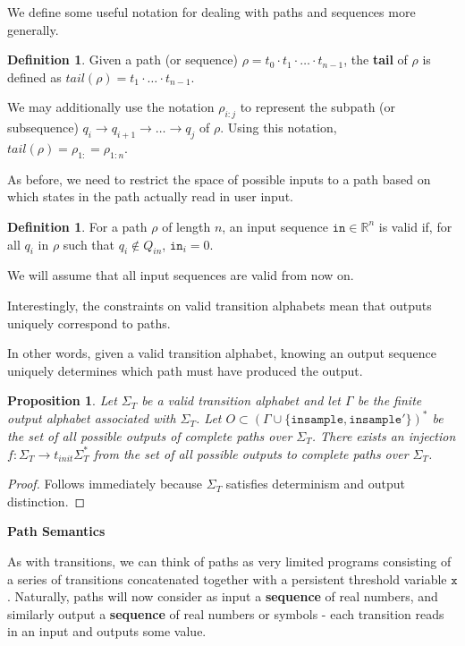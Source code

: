 \documentclass[12pt]{article}
\newcommand{\RR}{\mathbb{R}}
\newtheorem{prop}[thm]{Proposition}
\theoremstyle{definition}
\newtheorem{defn}[thm]{Definition}
\begin{document}
We define some useful notation for dealing with paths and sequences more generally. 

\begin{defn}
    Given a path (or sequence) $\rho = t_0\cdot t_1\cdot \ldots\cdot t_{n-1}$, the \textbf{tail} of $\rho$ is defined as $tail(\rho) = t_1\cdot \ldots\cdot t_{n-1}$. 

    We may additionally use the notation $\rho_{i:j}$ to represent the subpath (or subsequence) $q_i\to q_{i+1}\to \ldots \to q_j$ of $\rho$. Using this notation, $tail(\rho) = \rho_{1:} = \rho_{1:n}$.
\end{defn}


As before, we need to restrict the space of possible inputs to a path based on which states in the path actually read in user input.
\begin{defn}
    For a path $\rho$ of length $n$, an input sequence $\texttt{in}\in \RR^n$ is valid if, for all $q_i$ in $\rho$ such that $q_i \notin Q_{in}$, $\texttt{in}_i = 0$.  
\end{defn} 

We will assume that all input sequences are valid from now on. 

Interestingly, the constraints on valid transition alphabets mean that outputs uniquely correspond to paths. 

In other words, given a valid transition alphabet, knowing an output sequence uniquely determines which path must have produced the output. 


\begin{prop}
    Let $\Sigma_T$ be a valid transition alphabet and let $\Gamma$ be the finite output alphabet associated with $\Sigma_T$. Let $O\subset (\Gamma\cup\{\texttt{insample}, \texttt{insample}'\})^*$ be the set of all possible outputs of complete paths over $\Sigma_T$. There exists an injection $f: \Sigma_T\to t_{init}\Sigma_T^*$ from the set of all possible outputs to complete paths over $\Sigma_T$. 
\end{prop}
\begin{proof}
    Follows immediately because $\Sigma_T$ satisfies determinism and output distinction.
\end{proof}

\textbf{Path Semantics}

As with transitions, we can think of paths as very limited programs consisting of a series of transitions concatenated together with a persistent threshold variable $\texttt{x}$. Naturally, paths will now consider as input a \textbf{sequence} of real numbers, and similarly output a \textbf{sequence} of real numbers or symbols - each transition reads in an input and outputs some value.
\end{document}
